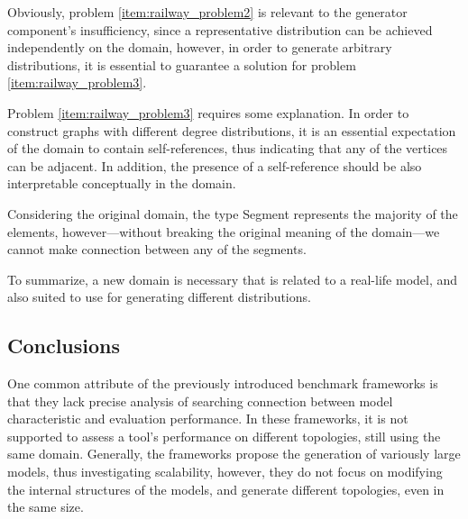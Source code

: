 Obviously, problem \ref{item:railway_problem2} is relevant to the generator component's insufficiency, since a representative distribution can be achieved independently on the domain, however, in order to generate arbitrary distributions, it is essential to guarantee a solution for problem \ref{item:railway_problem3}.

Problem \ref{item:railway_problem3} requires some explanation. In order to construct graphs with different degree distributions, it is an essential expectation of the domain to contain self-references, thus indicating that any of the vertices can be adjacent. In addition, the presence of a self-reference should be also interpretable conceptually in the domain. 

Considering the original domain, the type \textsf{Segment} represents the majority of the elements, however---without breaking the original meaning of the domain---we cannot make connection between any of the segments.


To summarize, a new domain is necessary that is related to a real-life model, and also suited to use for generating different distributions.


\subsection{Conclusions} \label{sec:benchmark_conclusions}

One common attribute of the previously introduced benchmark frameworks is that they lack precise analysis of searching connection between model characteristic and evaluation performance. In these frameworks, it is not supported to assess a tool's performance on different topologies, still using the same domain. Generally, the frameworks propose the generation of variously large models, thus investigating scalability, however, they do not focus on modifying the internal structures of the models, and generate different topologies, even in the same size.

